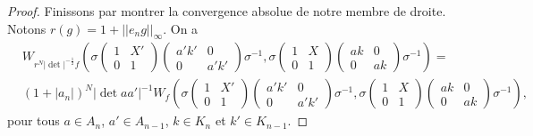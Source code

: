 \documentclass{amsart}
\begin{document}
\begin{proof}
Finissons par montrer la convergence absolue de notre membre de droite. Notons $r(g) = 1 + ||e_ng||_\infty$. On a
\begin{equation}
\begin{split}
& W_{r^N |\det|^{-\frac{1}{2}} f}\left(\sigma \begin{pmatrix}
1 & X' \\
0 & 1
\end{pmatrix} \begin{pmatrix}
a'k' & 0 \\
0 & a'k'
\end{pmatrix} \sigma^{-1}, \sigma \begin{pmatrix}
1 & X \\
0 & 1
\end{pmatrix} \begin{pmatrix}
ak & 0 \\
0 & ak
\end{pmatrix} \sigma^{-1}\right) = \\
& (1+|a_n|)^N |\det aa'|^{-1} W_f\left(\sigma \begin{pmatrix}
1 & X' \\
0 & 1
\end{pmatrix} \begin{pmatrix}
a'k' & 0 \\
0 & a'k'
\end{pmatrix} \sigma^{-1}, \sigma \begin{pmatrix}
1 & X \\
0 & 1
\end{pmatrix} \begin{pmatrix}
ak & 0 \\
0 & ak
\end{pmatrix} \sigma^{-1}\right),
\end{split}
\end{equation}
pour tous $a \in A_n$, $a' \in A_{n-1}$, $k \in K_n$ et  $k' \in K_{n-1}$.


\end{proof}
\end{document}
